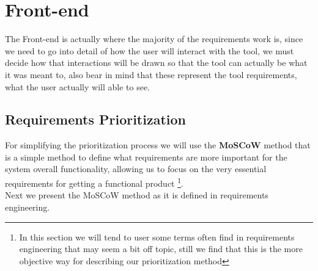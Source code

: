 
\section{Front-end}
\label{sec:frontend}

The Front-end is actually where the majority of the requirements work is, since we need to go into detail of how the user will interact with the tool, we must decide how that interactions will be drawn so that the tool can actually be what it was meant to, also bear in mind that these represent the tool requirements, what the user actually will able to see.

\subsection{Requirements Prioritization}
For simplifying the prioritization process we will use the \textbf{MoSCoW} method that is a simple method to define what requirements are more important for the system overall functionality, allowing us to focus on the very essential requirements for getting a functional product \footnote{In this section we will tend to user some terms often find in requirements engineering that may seem a bit off topic, still we find that this is the more objective way for describing our prioritization method}.\\
\indent Next we present the MoSCoW method as it is defined in requirements engineering.


